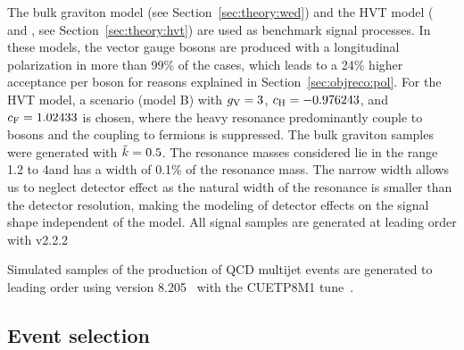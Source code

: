 The bulk graviton model (see Section~\ref{sec:theory:wed}) and the HVT model (\PWpr{} and \PZpr{}, see Section~\ref{sec:theory:hvt}) are used as benchmark signal processes. In these models, the vector gauge bosons are produced with a longitudinal polarization in more than 99\% of the cases, which leads to a 24\% higher acceptance per boson for reasons explained in Section~\ref{sec:objreco:pol}. For the HVT model, a scenario (model B) with $g_{\rm V}=3$, $c_{\rm H}=-0.976243$, and $c_{\rm F}=1.02433$ is chosen, where the heavy resonance predominantly couple to bosons and the coupling to fermions is suppressed. The bulk graviton samples were generated with $\tilde{k} = 0.5$.
The resonance masses considered lie in the range 1.2 to 4\TeV and has a width of 0.1\% of the resonance mass. The narrow width allows us to neglect detector effect as the natural width of the resonance is smaller than the detector resolution, making the modeling of detector effects on the signal shape independent of the model. All signal samples are generated at leading order with \amcatnlo{} v2.2.2~\cite{Alwall:2014hca} \par\par

Simulated samples of the production of QCD multijet events are generated to leading order using \PYTHIA version 8.205~\cite{Sjostrand:2007gs} with the CUETP8M1 tune~\cite{Khachatryan:2015pea}.


\subsection{Event selection}

